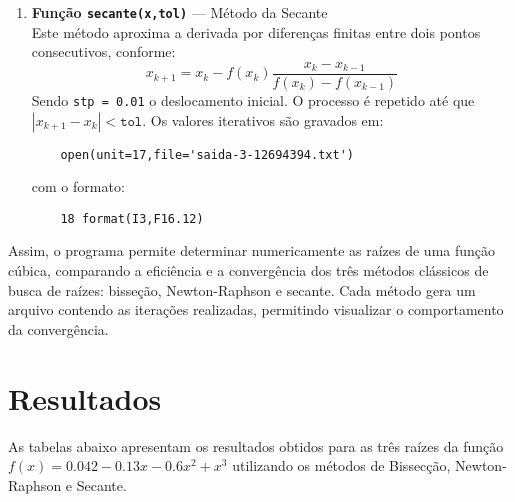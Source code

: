 \begin{enumerate}
	\item \textbf{Função \texttt{secante(x,tol)}} — Método da Secante \\
	Este método aproxima a derivada por diferenças finitas entre dois pontos consecutivos, conforme:
	\begin{equation}
		x_{k+1} = x_k - f(x_k)\frac{x_k - x_{k-1}}{f(x_k) - f(x_{k-1})}
	\end{equation}
	Sendo \texttt{stp = 0.01} o deslocamento inicial.  
	O processo é repetido até que $|x_{k+1} - x_k| < \texttt{tol}$.  
	Os valores iterativos são gravados em:
	\vspace*{1\baselineskip}
	\begin{lstlisting}
	open(unit=17,file='saida-3-12694394.txt')
	\end{lstlisting}
	com o formato:
	\vspace*{1\baselineskip}
	\begin{lstlisting}
	18 format(I3,F16.12)
	\end{lstlisting}
\end{enumerate}

\noindent
Assim, o programa permite determinar numericamente as raízes de uma função cúbica, 
comparando a eficiência e a convergência dos três métodos clássicos de busca de raízes: 
bisseção, Newton-Raphson e secante.  
Cada método gera um arquivo contendo as iterações realizadas, permitindo visualizar o comportamento da convergência.


\section*{Resultados}
As tabelas abaixo apresentam os resultados obtidos para as três raízes da função $f(x) = 0.042 - 0.13x - 0.6x^2 + x^3$ utilizando os métodos de Bissecção, Newton-Raphson e Secante.

